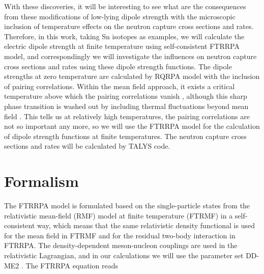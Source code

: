 \documentclass[aps,preprint,showpacs,superscriptaddress,floatfix]{revtex4-1} %
\begin{document}
With these discoveries, it will be interesting to see what are the consequences from these modifications of low-lying dipole strength with the microscopic inclusion of temperature effects on the neutron capture cross sections and rates. Therefore, in this work, taking Sn isotopes as examples, we will calculate the electric dipole strength at finite temperature using self-consistent FTRRPA model, and correspondingly we will investigate the influences on neutron capture cross sections and rates using these dipole strength functions. The dipole strengths at zero temperature are calculated by RQRPA model with the inclusion of pairing correlations. Within the mean field approach, it exists a critical temperature above which the pairing correlations vanish \cite{Niu2013, Yuksel}, although this sharp phase transition is washed out by including thermal fluctuations beyond mean field \cite{Gambarcuta}. This tells us at relatively high temperatures, the pairing correlations are not so important any more, so we will use the FTRRPA model for the calculation of dipole strength functions at finite temperatures. The neutron capture cross sections and rates will be calculated by TALYS code.





\section{Formalism}\label{formalism}

The FTRRPA model is formulated based on the single-particle states from the relativistic mean-field (RMF) model at finite temperature (FTRMF) in a self-consistent way, which means that the same relativistic density functional is used for the mean field in FTRMF and for the residual two-body interaction in FTRRPA. The density-dependent meson-nucleon couplings are used in the relativistic Lagrangian, and in our calculations we will use the parameter set DD-ME2 \cite{Lala}. The FTRRPA equation reads \cite{Niu_2009}
\end{document}
